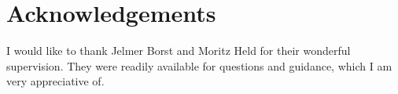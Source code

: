 
\section*{Acknowledgements}\label{sec:acknowledgements}
I would like to thank Jelmer Borst and Moritz Held for their wonderful supervision.
They were readily available for questions and guidance, which I am very appreciative of.